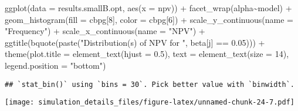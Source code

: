 \documentclass[
]{article}
\newenvironment{Shaded}{\begin{snugshade}}{\end{snugshade}}
\newcommand{\AttributeTok}[1]{\textcolor[rgb]{0.77,0.63,0.00}{#1}}
\newcommand{\DecValTok}[1]{\textcolor[rgb]{0.00,0.00,0.81}{#1}}
\newcommand{\FloatTok}[1]{\textcolor[rgb]{0.00,0.00,0.81}{#1}}
\newcommand{\FunctionTok}[1]{\textcolor[rgb]{0.00,0.00,0.00}{#1}}
\newcommand{\NormalTok}[1]{#1}
\newcommand{\SpecialCharTok}[1]{\textcolor[rgb]{0.00,0.00,0.00}{#1}}
\newcommand{\StringTok}[1]{\textcolor[rgb]{0.31,0.60,0.02}{#1}}
\begin{document}
\begin{Shaded}
\begin{Highlighting}[]
\FunctionTok{ggplot}\NormalTok{(}\AttributeTok{data =}\NormalTok{ results.smallB.opt,}
       \FunctionTok{aes}\NormalTok{(}\AttributeTok{x =}\NormalTok{ npv)) }\SpecialCharTok{+}
  \FunctionTok{facet\_wrap}\NormalTok{(alpha}\SpecialCharTok{\textasciitilde{}}\NormalTok{model) }\SpecialCharTok{+}
  \FunctionTok{geom\_histogram}\NormalTok{(}\AttributeTok{fill =}\NormalTok{ cbpg[}\DecValTok{8}\NormalTok{], }\AttributeTok{color =}\NormalTok{ cbpg[}\DecValTok{6}\NormalTok{]) }\SpecialCharTok{+}
  \FunctionTok{scale\_y\_continuous}\NormalTok{(}\AttributeTok{name =} \StringTok{"Frequency"}\NormalTok{) }\SpecialCharTok{+}
  \FunctionTok{scale\_x\_continuous}\NormalTok{(}\AttributeTok{name =} \StringTok{"NPV"}\NormalTok{) }\SpecialCharTok{+}
  \FunctionTok{ggtitle}\NormalTok{(}\FunctionTok{bquote}\NormalTok{(}\FunctionTok{paste}\NormalTok{(}\StringTok{"Distribution(s) of NPV for "}\NormalTok{, beta[j] }\SpecialCharTok{==} \FloatTok{0.05}\NormalTok{))) }\SpecialCharTok{+}
  \FunctionTok{theme}\NormalTok{(}\AttributeTok{plot.title =} \FunctionTok{element\_text}\NormalTok{(}\AttributeTok{hjust =} \FloatTok{0.5}\NormalTok{), }
        \AttributeTok{text =} \FunctionTok{element\_text}\NormalTok{(}\AttributeTok{size =} \DecValTok{14}\NormalTok{),}
        \AttributeTok{legend.position =} \StringTok{"bottom"}\NormalTok{)}
\end{Highlighting}
\end{Shaded}

\begin{verbatim}
## `stat_bin()` using `bins = 30`. Pick better value with `binwidth`.
\end{verbatim}

\texttt{[image: simulation\_details\_files/figure-latex/unnamed-chunk-24-7.pdf]}
\end{document}
